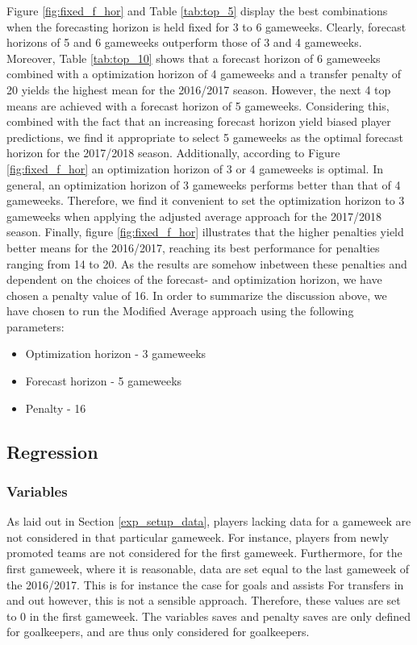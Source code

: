 Figure \ref{fig:fixed_f_hor} and Table \ref{tab:top_5} display the best combinations when the forecasting horizon is held fixed for 3 to 6 gameweeks. Clearly, forecast horizons of 5 and 6 gameweeks outperform those of 3 and 4 gameweeks. Moreover, Table \ref{tab:top_10} shows that a forecast horizon of 6 gameweeks combined with a optimization horizon of 4 gameweeks and a transfer penalty of 20 yields the highest mean for the 2016/2017 season. However, the next 4 top means are achieved with a forecast horizon of 5 gameweeks. Considering this, combined with the fact that an increasing forecast horizon yield biased player predictions, we find it appropriate to select 5 gameweeks as the optimal forecast horizon for the 2017/2018 season. Additionally, according to Figure \ref{fig:fixed_f_hor} an optimization horizon of 3 or 4 gameweeks is optimal. In general, an optimization horizon of 3 gameweeks performs better than that of 4 gameweeks. Therefore, we find it convenient to set the optimization horizon to 3 gameweeks when applying the adjusted average approach for the 2017/2018 season.
Finally, figure \ref{fig:fixed_f_hor} illustrates that the higher penalties yield better means for the 2016/2017, reaching its best performance for penalties ranging from 14 to 20. 
\newpar
As the results are somehow inbetween these penalties and dependent on the choices of the forecast- and optimization horizon, we have chosen a penalty value of 16. 
\newpar
In order to summarize the discussion above, we have chosen to run the Modified Average approach using the following parameters:
\begin{itemize}
    \item Optimization horizon - 3 gameweeks
    \item Forecast horizon - 5 gameweeks
    \item Penalty - 16
\end{itemize}

\subsection{Regression}\label{exp_setup_reg}

\subsubsection{Variables}

As laid out in Section \ref{exp_setup_data}, players lacking data for a gameweek are not considered in that particular gameweek. For instance, players from newly promoted teams are not considered for the first gameweek. Furthermore, for the first gameweek, where it is reasonable, data are set equal to the last gameweek of the 2016/2017. This is for instance the case for goals and assists For transfers in and out however, this is not a sensible approach. Therefore, these values are set to 0 in the first gameweek. The variables saves and penalty saves are only defined for goalkeepers, and are thus only considered for goalkeepers.

